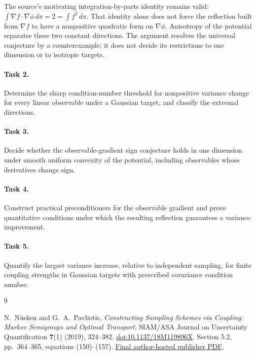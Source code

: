 \documentclass[10pt]{article}
\begin{document}
The source's motivating integration-by-parts identity remains valid:
\(\int\nabla f\cdot\nabla\phi\,d\pi=2=\int f^2\,d\pi\).
That identity alone does not force the reflection built from
\(\nabla f\) to have a nonpositive quadratic form on \(\nabla\phi\).
Anisotropy of the potential separates these two constant directions.
The argument resolves the universal conjecture by a counterexample; it
does not decide its restrictions to one dimension or to isotropic targets.

\paragraph{Task 2.} Determine the sharp condition-number threshold for
nonpositive variance change for every linear observable under a Gaussian
target, and classify the extremal directions.

\paragraph{Task 3.} Decide whether the observable-gradient sign conjecture
holds in one dimension under smooth uniform convexity of the potential,
including observables whose derivatives change sign.

\paragraph{Task 4.} Construct practical preconditioners for the observable
gradient and prove quantitative conditions under which the resulting
reflection guarantees a variance improvement.

\paragraph{Task 5.} Quantify the largest variance increase, relative to
independent sampling, for finite coupling strengths in Gaussian targets
with prescribed covariance condition number.

\begin{thebibliography}{9}
\raggedright
{}
N.~N\"usken and G.~A.~Pavliotis,
\emph{Constructing Sampling Schemes via Coupling: Markov Semigroups and
Optimal Transport}, SIAM/ASA Journal on Uncertainty Quantification
\textbf{7}(1) (2019), 324--382.
\href{https://doi.org/10.1137/18M119896X}{doi:10.1137/18M119896X}.
Section 5.2, pp.~364--365, equations (150)--(157).
\href{https://www.ma.imperial.ac.uk/~pavl/NuskenPavliotis2018.pdf}{Final author-hosted publisher PDF}.
\end{thebibliography}
\end{document}
